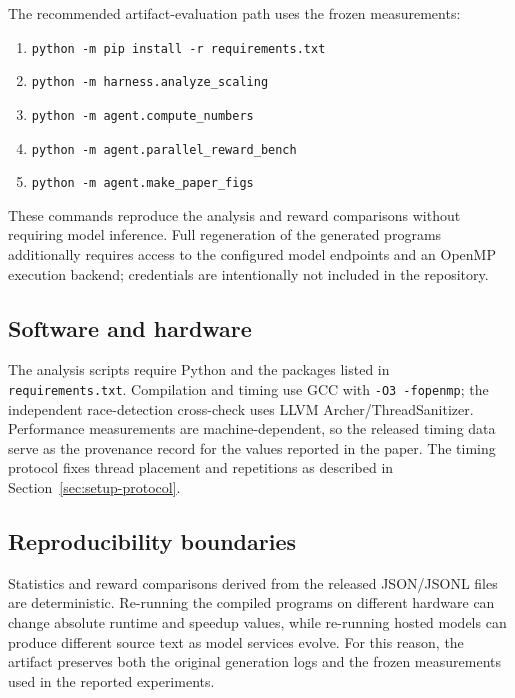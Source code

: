 The recommended artifact-evaluation path uses the frozen measurements:
\begin{enumerate}
  \item \texttt{python -m pip install -r requirements.txt}
  \item \texttt{python -m harness.analyze\_scaling}
  \item \texttt{python -m agent.compute\_numbers}
  \item \texttt{python -m agent.parallel\_reward\_bench}
  \item \texttt{python -m agent.make\_paper\_figs}
\end{enumerate}
These commands reproduce the analysis and reward comparisons without requiring
model inference. Full regeneration of the generated programs additionally
requires access to the configured model endpoints and an OpenMP execution
backend; credentials are intentionally not included in the repository.

\subsection*{Software and hardware}

The analysis scripts require Python and the packages listed in
\texttt{requirements.txt}. Compilation and timing use GCC with
\texttt{-O3 -fopenmp}; the independent race-detection cross-check uses LLVM
Archer/ThreadSanitizer. Performance measurements are machine-dependent, so the
released timing data serve as the provenance record for the values reported in
the paper. The timing protocol fixes thread placement and repetitions as
described in Section~\ref{sec:setup-protocol}.

\subsection*{Reproducibility boundaries}

Statistics and reward comparisons derived from the released JSON/JSONL files are
deterministic. Re-running the compiled programs on different hardware can change
absolute runtime and speedup values, while re-running hosted models can produce
different source text as model services evolve. For this reason, the artifact
preserves both the original generation logs and the frozen measurements used in
the reported experiments.
